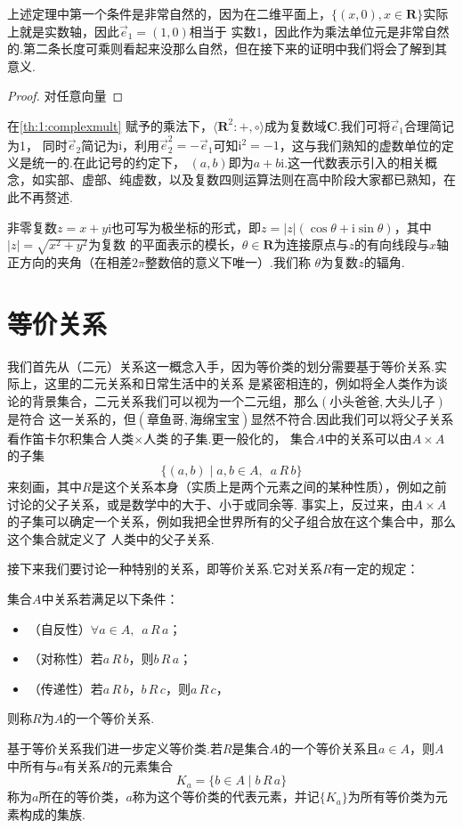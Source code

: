 上述定理中第一个条件是非常自然的，因为在二维平面上，$\{(x,0),x\in\mathbf{R}\}$实际上就是实数轴，因此$\vec{e}_1=(1,0)$相当于
实数1，因此作为乘法单位元是非常自然的.第二条长度可乘则看起来没那么自然，但在接下来的证明中我们将会了解到其意义.

\begin{proof}
    对任意向量
\end{proof}

在\autoref{th:1:complexmult} 赋予的乘法下，$\langle\mathbf{R}^2:+,\circ\rangle$成为复数域$\mathbf{C}$.我们可将$\vec{e}_1$合理简记为1，
同时$\vec{e}_2$简记为$\mathrm{i}$，利用$\vec{e}_2^2=-\vec{e}_1$可知$\mathrm{i}^2=-1$，这与我们熟知的虚数单位的定义是统一的.在此记号的约定下，
$(a,b)$即为$a+b\mathrm{i}$.这一代数表示引入的相关概念，如实部、虚部、纯虚数，以及复数四则运算法则在高中阶段大家都已熟知，在此不再赘述.

非零复数$z=x+y\mathrm{i}$也可写为极坐标的形式，即$z=|z|(\cos\theta+\mathrm{i}\sin\theta)$，其中$|z|=\sqrt{x^2+y^2}$为复数
的平面表示的模长，$\theta\in\mathbf{R}$为连接原点与$z$的有向线段与$x$轴正方向的夹角（在相差$2\pi$整数倍的意义下唯一）.我们称
$\theta$为复数$z$的辐角.

\section{等价关系}
我们首先从（二元）关系这一概念入手，因为等价类的划分需要基于等价关系.实际上，这里的二元关系和日常生活中的关系
是紧密相连的，例如将全人类作为谈论的背景集合，二元关系我们可以视为一个二元组，那么$(\text{小头爸爸}, \text{大头儿子})$是符合
这一关系的，但$(\text{章鱼哥}, \text{海绵宝宝})$显然不符合.因此我们可以将父子关系看作笛卡尔积集合$\text{人类}\times\text{人类}$的子集.更一般化的，
集合$A$中的关系可以由$A\times A$的子集
\[\{(a,b) \mid a,b\in A, \enspace a\,R\,b\}\]
来刻画，其中$R$是这个关系本身（实质上是两个元素之间的某种性质），例如之前讨论的父子关系，或是数学中的大于、小于或同余等.
事实上，反过来，由$A\times A$的子集可以确定一个关系，例如我把全世界所有的父子组合放在这个集合中，那么这个集合就定义了
人类中的父子关系.

接下来我们要讨论一种特别的关系，即等价关系.它对关系$R$有一定的规定：
\begin{definition}
    集合$A$中关系若满足以下条件：
    \begin{itemize}
        \item（自反性）$\forall a\in A, \enspace a\,R\,a$；

        \item（对称性）若$a\,R\,b$，则$b\,R\,a$；

        \item（传递性）若$a\,R\,b$，$b\,R\,c$，则$a\,R\,c$，
    \end{itemize}
    则称$R$为$A$的一个等价关系.
\end{definition}
基于等价关系我们进一步定义等价类.若$R$是集合$A$的一个等价关系且$a\in A$，则$A$中所有与$a$有关系$R$的元素集合
\[K_a=\{b\in A \mid b\,R\,a\}\]
称为$a$所在的等价类，$a$称为这个等价类的代表元素，并记$\{K_a\}$为所有等价类为元素构成的集族.

